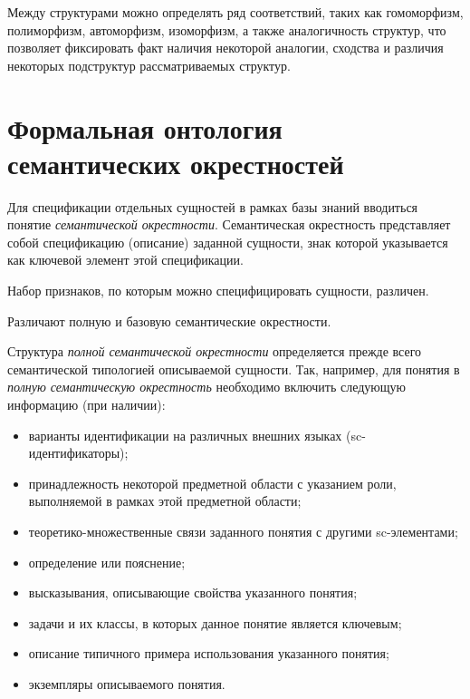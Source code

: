 Между структурами можно определять ряд соответствий, таких как гомоморфизм, полиморфизм, автоморфизм, изоморфизм, а также аналогичность структур, что позволяет фиксировать факт наличия некоторой аналогии, сходства и различия некоторых подструктур рассматриваемых структур.



\section{Формальная онтология семантических окрестностей}

Для спецификации отдельных сущностей в рамках базы знаний вводиться понятие \textit{семантической окрестности}. Семантическая окрестность представляет собой спецификацию (описание) заданной сущности, знак которой указывается как ключевой элемент этой спецификации.

Набор признаков, по которым можно специфицировать сущности, различен.

Различают полную и базовую семантические окрестности.

\begin{SCn}
\end{SCn}

Структура \textit{полной семантической окрестности} определяется прежде всего семантической типологией описываемой сущности.
Так, например, для понятия в \textit{полную семантическую окрестность} необходимо включить следующую
информацию (при наличии):
\begin{itemize}
	\item{варианты идентификации на различных внешних языках (sc-идентификаторы)};
	\item{принадлежность некоторой предметной области с указанием роли, выполняемой в рамках этой предметной области};
	\item{теоретико-множественные связи заданного понятия с другими sc-элементами};
	\item{определение или пояснение};
	\item{высказывания, описывающие свойства указанного понятия};
	\item{задачи и их классы, в которых данное понятие является ключевым};
	\item{описание типичного примера использования указанного понятия};
	\item{экземпляры описываемого понятия}.
\end{itemize}

